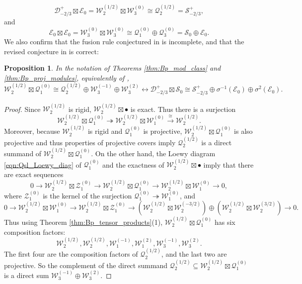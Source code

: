 \documentclass[11pt, reqno]{amsart}
\newtheorem{prop}[thm]{Proposition}
\theoremstyle{definition}\newtheorem{defi}[thm]{Definition}
\theoremstyle{definition}\newtheorem{rem}[thm]{Remark}
\theoremstyle{definition}\newtheorem{exam}[thm]{Example}
\theoremstyle{definition}\newtheorem{assum}[thm]{Assumption}
\newcommand{\cD}{\mathcal{D}}
\newcommand{\cE}{\mathcal{E}}
\newcommand{\cS}{\mathcal{S}}
\newcommand{\cW}{\mathcal{W}}
\newcommand{\cZ}{\mathcal{Z}}
\newcommand{\cQ}{\mathcal{Q}}
\newcommand{\tens}{\boxtimes}
\begin{document}
\begin{equation*}
\cD_{-2/3}^+\tens\cE_0 = \cW_2^{(1/2)}\tens\cW_3^{(0)} \cong \cQ_2^{(1/2)} = \cS^+_{-2/3},
\end{equation*}
and
\begin{equation*}
\cE_0\tens\cE_0 = \cW_3^{(0)}\tens\cW_3^{(0)} \cong \cQ_1^{(0)}\oplus\cQ_3^{(0)} =\cS_0\oplus\cE_0.
\end{equation*}
We also confirm that the fusion rule conjectured in \cite[Equation 8.2]{Ga} is incomplete, and that the revised conjecture in \cite[Equation 5.26]{CR1} is correct:
\begin{prop}
In the notation of Theorems \ref{thm:Bp_mod_class} and \ref{thm:Bp_proj_modules}, equivalently of \cite{CR1},
\begin{equation*}
\cW_2^{(1/2)}\tens\cQ_1^{(0)}\cong\cQ_2^{(1/2)}\oplus\cW_3^{(-1)}\oplus\cW_3^{(2)}\longleftrightarrow \cD_{-2/3}^+\tens\cS_0\cong\cS_{-2/3}^+\oplus\sigma^{-1}(\cE_0)\oplus\sigma^2(\cE_0).
\end{equation*}
\end{prop}
\begin{proof}
Since $\cW_2^{(1/2)}$ is rigid, $\cW_2^{(1/2)}\tens\bullet$ is exact. Thus there is a surjection
\begin{equation*}
\cW_2^{(1/2)}\tens\cQ_1^{(0)}\twoheadrightarrow\cW_2^{(1/2)}\tens\cW_1^{(0)}\xrightarrow{\cong}\cW_2^{(1/2)}.
\end{equation*}
Moreover, because $\cW_2^{(1/2)}$ is rigid and $\cQ_1^{(0)}$ is projective, $\cW_2^{(1/2)}\tens\cQ_1^{(0)}$ is also projective and thus properties of projective covers imply $\cQ_2^{(1/2)}$ is a direct summand of $\cW_2^{(1/2)}\tens\cQ_1^{(0)}$. On the other hand, the Loewy diagram \eqref{eqn:Qsl_Loewy_diag} of $\cQ_1^{(0)}$ and the exactness of $\cW_2^{(1/2)}\tens\bullet$ imply that there are exact sequences
\begin{equation*}
0\longrightarrow\cW_2^{(1/2)}\tens\cZ_1^{(0)}\longrightarrow\cW_2^{(1/2)}\tens\cQ_1^{(0)}\longrightarrow\cW_2^{(1/2)}\tens\cW_1^{(0)}\longrightarrow 0,
\end{equation*}
where $\cZ_1^{(0)}$ is the kernel of the surjection $\cQ_1^{(0)}\twoheadrightarrow\cW_1^{(0)}$, and 
\begin{equation*}
0\longrightarrow\cW_2^{(1/2)}\tens\cW_1^{(0)}\longrightarrow\cW_2^{(1/2)}\tens\cZ_1^{(0)}\longrightarrow(\cW_2^{(1/2)}\tens\cW_2^{(-3/2)})\oplus(\cW_2^{(1/2)}\tens\cW_2^{(3/2)})\longrightarrow 0.
\end{equation*}
Thus using Theorem \ref{thm:Bp_tensor_products}(1), $\cW_2^{(1/2)}\tens\cQ_1^{(0)}$ has six composition factors:
\begin{equation*}
\cW_2^{(1/2)}, \cW_2^{(1/2)}, \cW_1^{(-1)}, \cW_1^{(2)},\cW_3^{(-1)},\cW_3^{(2)}.
\end{equation*}
The first four are the composition factors of $\cQ_2^{(1/2)}$,  and the last two are projective. So the complement of the direct summand $\cQ_2^{(1/2)}\subseteq\cW_2^{(1/2)}\tens\cQ_1^{(0)}$ is a direct sum $\cW_3^{(-1)}\oplus\cW_3^{(2)}$.
\end{proof}
\end{document}
